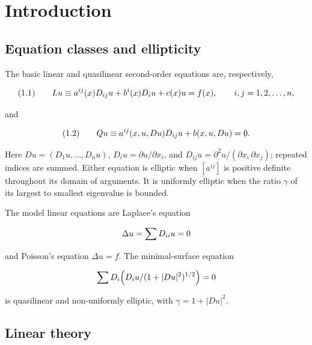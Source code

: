 \chapter{Introduction}

\section*{Equation classes and ellipticity}

The basic linear and quasilinear second-order equations are, respectively,

\begin{equation}\label{gt.eq1.1}\dcref{(1.1)}\group{chapter-1}\source{gilbarg-trudinger:page-0014}
(1.1)\qquad Lu \equiv a^{ij}(x)D_{ij}u+b^i(x)D_i u+c(x)u=f(x),\qquad i,j=1,2,\dots,n,
\end{equation}

and

\begin{equation}\label{gt.eq1.2}\dcref{(1.2)}\group{chapter-1}\source{gilbarg-trudinger:page-0014}
(1.2)\qquad Qu \equiv a^{ij}(x,u,Du)D_{ij}u+b(x,u,Du)=0.
\end{equation}

Here $Du=(D_1u,\dots,D_nu)$, $D_i u=\partial u/\partial x_i$, and
$D_{ij}u=\partial^2u/(\partial x_i\,\partial x_j)$; repeated indices are
summed. Either equation is elliptic when $[a^{ij}]$ is positive definite
throughout its domain of arguments. It is uniformly elliptic when the ratio
$\gamma$ of its largest to smallest eigenvalue is bounded.

The model linear equations are Laplace's equation

\begin{equation}\label{gt.eq1.3}\dcref{(1.3)}\group{chapter-1}\source{gilbarg-trudinger:page-0014}
\Delta u = \sum D_{ii}u = 0
\end{equation}

and Poisson's equation $\Delta u=f$. The minimal-surface equation

\begin{equation}\label{gt.eq1.4}\dcref{(1.4)}\group{chapter-1}\source{gilbarg-trudinger:page-0014}
\sum D_i\!\left(D_i u/(1+|Du|^2)^{1/2}\right)=0
\end{equation}

is quasilinear and non-uniformly elliptic, with
$\gamma=1+|Du|^2$.

\section*{Linear theory}

